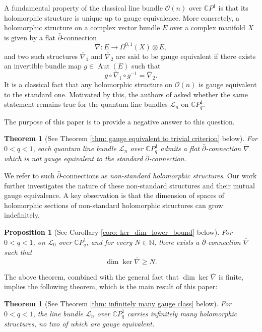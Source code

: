 \documentclass[12pt]{article}
\newtheorem{proposition}[definition]{Proposition}
\newtheorem{theorem}[definition]{Theorem}
\numberwithin{equation}{section}
\def\C{{\mathbb C}}
\def\L{\mathcal{L}}
\begin{document}
A fundamental property of the classical line bundle $\mathcal{O}(n)$ over $\C P^1$ is that its holomorphic structure is unique up to gauge equivalence. More concretely, a holomorphic structure on a complex vector bundle $E$ over a complex manifold $X$ is given by a flat $\bar{\partial}$-connection
\[
\overline{\nabla}: E \longrightarrow \Omega^{0,1}(X)\otimes E,
\]
and two such structures $\overline{\nabla}_1$ and $\overline{\nabla}_2$ are said to be gauge equivalent if there exists an invertible bundle map $g\in \operatorname{Aut}(E)$ such that
\[
g\circ \overline{\nabla}_1\circ g^{-1} = \overline{\nabla}_2.
\]
It is a classical fact that any holomorphic structure on $\mathcal{O}(n)$ is gauge equivalent to the standard one. Motivated by this, the authors of \cite[Page 872]{khalkhali2011holomorphic} asked whether the same statement remains true for the quantum line bundles $\L_n$ on $\C P^1_q$.

The purpose of this paper is to provide a negative answer to this question.

\begin{theorem}[See Theorem \ref{thm: gauge equivalent to trivial criterion} below]
For $0<q<1$, each quantum line bundle $\L_n$ over $\C P^1_q$ admits a flat $\bar{\partial}$-connection $\overline{\nabla}$ which is not gauge equivalent to the standard $\bar{\partial}$-connection.
\end{theorem}

We refer to such $\bar{\partial}$-connections as \emph{non-standard holomorphic structures}. Our work further investigates the nature of these non-standard structures and their mutual gauge equivalence. A key observation is that the dimension of spaces of holomorphic sections of non-standard holomorphic structures can grow indefinitely.

\begin{proposition}[See Corollary \ref{coro: ker_dim_lower_bound} below]
For $0<q<1$, on $\L_0$ over $\C P^1_q$, and for every $N\in\mathbb{N}$, there exists a $\bar{\partial}$-connection $\overline{\nabla}$ such that
\[
\dim \ker \overline{\nabla} \geq N.
\]
\end{proposition}

The above theorem, combined with the general fact that $\dim \ker \overline{\nabla}$ is finite, implies the following theorem, which is the main result of this paper:

\begin{theorem}[See Theorem \ref{thm: infinitely many gauge class} below]
For $0<q<1$, the line bundle $\L_n$ over $\C P^1_q$ carries infinitely many holomorphic structures, no two of which are gauge equivalent.
\end{theorem}
\end{document}
